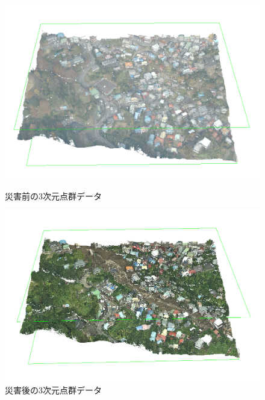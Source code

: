 \documentclass[a4paper, twocolumn, xelatex, 10pt, ja=standard, Ligatures=TeX]{bxjsarticle}
\begin{document}
		\begin{figure}[!h]
			\begin{minipage}{0.48\hsize}
				\centering
				\small
				\includegraphics[width=\linewidth]{img/io_img/tengun_before.png}
				\caption{災害前の3次元点群データ}
				\label{figure_before}
			\end{minipage}
			\begin{minipage}{0.48\hsize}
				\centering
				\small
				\includegraphics[width=\linewidth]{img/io_img/tengun_after.png}
				\caption{災害後の3次元点群データ}
				\label{figure_after}
			\end{minipage}
		\end{figure}
\end{document}

